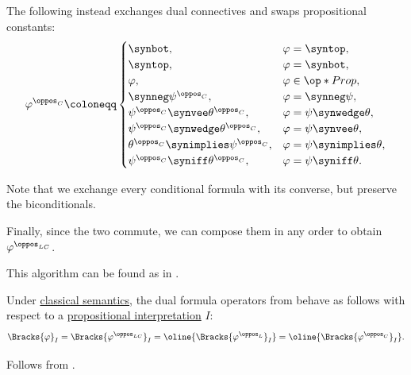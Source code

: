 \begin{algorithm}
\begin{thmenum}
     The following instead exchanges dual connectives and swaps propositional constants:
    \begin{equation*}
      \varphi^{\oppos_C} \coloneqq \begin{cases}
        \synbot,                                       &\varphi = \syntop, \\
        \syntop,                                       &\varphi = \synbot, \\
        \varphi,                                       &\varphi \in \op*{Prop}, \\
        \synneg \psi^{\oppos_C},                       &\varphi = \synneg \psi, \\
        \psi^{\oppos_C} \synvee \theta^{\oppos_C},     &\varphi = \psi \synwedge \theta, \\
        \psi^{\oppos_C} \synwedge \theta^{\oppos_C},   &\varphi = \psi \synvee \theta, \\
        \theta^{\oppos_C} \synimplies \psi^{\oppos_C}, &\varphi = \psi \synimplies \theta, \\
        \psi^{\oppos_C} \syniff \theta^{\oppos_C},     &\varphi = \psi \syniff \theta. \\
      \end{cases}
    \end{equation*}

    Note that we exchange every conditional formula with its converse, but preserve the biconditionals.

     Finally, since the two commute, we can compose them in any order to obtain \( \varphi^{\oppos_{LC}} \).
  \end{thmenum}
\end{algorithm}
\begin{comments}
  \item This algorithm can be found as  in \cite{notebook:code}.
\end{comments}

\begin{proposition}\label{thm:opposite_propositional_formula_semantics}
  Under \hyperref[def:truth_value_algebra/intuitionistic]{classical semantics}, the dual formula operators from  behave as follows with respect to a \hyperref[def:propositional_interpretation]{propositional interpretation} \( I \):
  \begin{equation*}
    \Bracks{\varphi}_I = \Bracks{\varphi^{\oppos_{LC}}}_I = \oline{\Bracks{\varphi^{\oppos_L}}_I} = \oline{\Bracks{\varphi^{\oppos_C}}_I}.
  \end{equation*}
\end{proposition}
\begin{comments}
  \item Follows from .
\end{comments}
